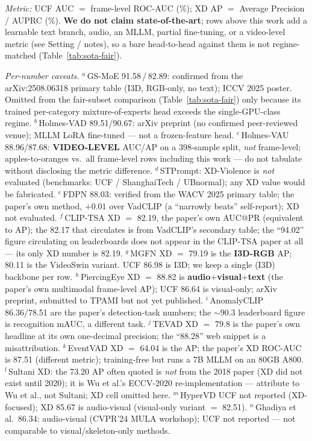 \begin{table}[p]
\vspace{2pt}
\scriptsize
\begin{flushleft}
\textit{Metric:} UCF AUC $=$ frame-level ROC-AUC (\%); XD AP $=$ Average
Precision / AUPRC (\%). \textbf{We do not claim state-of-the-art}; rows above
this work add a learnable text branch, audio, an MLLM, partial fine-tuning, or
a video-level metric (see Setting / notes), so a bare head-to-head against them
is not regime-matched (Table~\ref{tab:sota-fair}).\par\smallskip
\textit{Per-number caveats.}
$^{a}$\,GS-MoE 91.58\,/\,82.89: confirmed from the arXiv:2508.06318 primary table
(I3D, RGB-only, no text); ICCV 2025 poster. Omitted from the fair-subset comparison
(Table~\ref{tab:sota-fair}) only
because its trained per-category mixture-of-experts head exceeds the single-GPU-class regime.
$^{b}$\,Holmes-VAD 89.51/90.67: arXiv preprint (no confirmed peer-reviewed venue);
MLLM LoRA fine-tuned --- not a frozen-feature head.
$^{c}$\,Holmes-VAU 88.96/87.68: \textbf{VIDEO-LEVEL} AUC/AP on a 398-sample split,
\emph{not} frame-level; apples-to-oranges vs.\ all frame-level rows including this
work --- do not tabulate without disclosing the metric difference.
$^{d}$\,STPrompt: XD-Violence is \emph{not} evaluated (benchmarks: UCF /
ShanghaiTech / UBnormal); any XD value would be fabricated.
$^{e}$\,FDPN 88.03: verified from the WACV 2025 primary table; the paper's own
method, $+0.01$ over VadCLIP (a ``narrowly beats'' self-report); XD not evaluated.
$^{f}$\,CLIP-TSA XD $=$ 82.19, the paper's own AUC@PR (equivalent to AP); the
82.17 that circulates is from VadCLIP's secondary table; the ``94.02'' figure
circulating on leaderboards does not appear in the CLIP-TSA paper at all ---
its only XD number is 82.19.
$^{g}$\,MGFN XD $=$ 79.19 is the \textbf{I3D-RGB} AP; 80.11 is the VideoSwin
variant. UCF 86.98 is I3D; we keep a single (I3D) backbone per row.
$^{h}$\,PiercingEye XD $=$ 88.82 is \textbf{audio$+$visual$+$text} (the paper's
own multimodal frame-level AP); UCF 86.64 is visual-only; arXiv preprint,
submitted to TPAMI but not yet published.
$^{i}$\,AnomalyCLIP 86.36/78.51 are the paper's detection-task numbers; the
$\sim$90.3 leaderboard figure is recognition mAUC, a different task.
$^{j}$\,TEVAD XD $=$ 79.8 is the paper's own headline at its own one-decimal
precision; the ``88.28'' web snippet is a misattribution.
$^{k}$\,EventVAD XD $=$ 64.04 is the AP; the paper's XD ROC-AUC is 87.51 (different
metric); training-free but runs a 7B MLLM on an 80GB A800.
$^{l}$\,Sultani XD: the 73.20 AP often quoted is \emph{not} from the 2018 paper
(XD did not exist until 2020); it is Wu et al.'s ECCV-2020 re-implementation ---
attribute to Wu et al., not Sultani; XD cell omitted here.
$^{m}$\,HyperVD UCF not reported (XD-focused); XD 85.67 is audio-visual
(visual-only variant $=$ 82.51).
$^{n}$\,Ghadiya et al.\ 86.34: audio-visual (CVPR'24 MULA workshop); UCF not
reported --- not comparable to visual/skeleton-only methods.
\end{flushleft}
\end{table}

